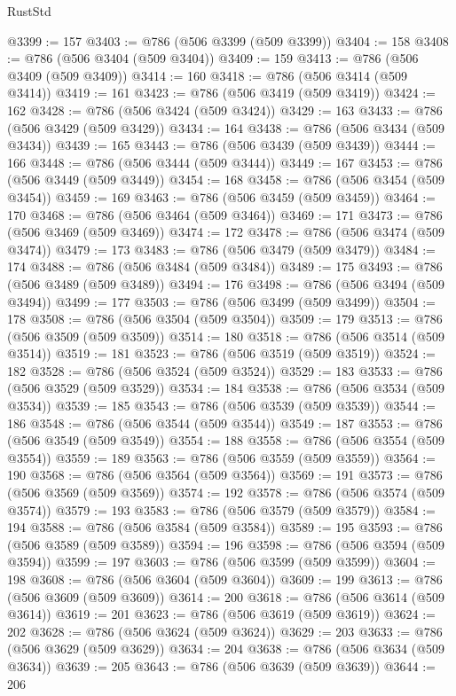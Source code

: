 \begin{lexlean}{RustStd}
\begin{coremodule}
@3399 := 157
@3403 := @786 (@506 @3399 (@509 @3399))
@3404 := 158
@3408 := @786 (@506 @3404 (@509 @3404))
@3409 := 159
@3413 := @786 (@506 @3409 (@509 @3409))
@3414 := 160
@3418 := @786 (@506 @3414 (@509 @3414))
@3419 := 161
@3423 := @786 (@506 @3419 (@509 @3419))
@3424 := 162
@3428 := @786 (@506 @3424 (@509 @3424))
@3429 := 163
@3433 := @786 (@506 @3429 (@509 @3429))
@3434 := 164
@3438 := @786 (@506 @3434 (@509 @3434))
@3439 := 165
@3443 := @786 (@506 @3439 (@509 @3439))
@3444 := 166
@3448 := @786 (@506 @3444 (@509 @3444))
@3449 := 167
@3453 := @786 (@506 @3449 (@509 @3449))
@3454 := 168
@3458 := @786 (@506 @3454 (@509 @3454))
@3459 := 169
@3463 := @786 (@506 @3459 (@509 @3459))
@3464 := 170
@3468 := @786 (@506 @3464 (@509 @3464))
@3469 := 171
@3473 := @786 (@506 @3469 (@509 @3469))
@3474 := 172
@3478 := @786 (@506 @3474 (@509 @3474))
@3479 := 173
@3483 := @786 (@506 @3479 (@509 @3479))
@3484 := 174
@3488 := @786 (@506 @3484 (@509 @3484))
@3489 := 175
@3493 := @786 (@506 @3489 (@509 @3489))
@3494 := 176
@3498 := @786 (@506 @3494 (@509 @3494))
@3499 := 177
@3503 := @786 (@506 @3499 (@509 @3499))
@3504 := 178
@3508 := @786 (@506 @3504 (@509 @3504))
@3509 := 179
@3513 := @786 (@506 @3509 (@509 @3509))
@3514 := 180
@3518 := @786 (@506 @3514 (@509 @3514))
@3519 := 181
@3523 := @786 (@506 @3519 (@509 @3519))
@3524 := 182
@3528 := @786 (@506 @3524 (@509 @3524))
@3529 := 183
@3533 := @786 (@506 @3529 (@509 @3529))
@3534 := 184
@3538 := @786 (@506 @3534 (@509 @3534))
@3539 := 185
@3543 := @786 (@506 @3539 (@509 @3539))
@3544 := 186
@3548 := @786 (@506 @3544 (@509 @3544))
@3549 := 187
@3553 := @786 (@506 @3549 (@509 @3549))
@3554 := 188
@3558 := @786 (@506 @3554 (@509 @3554))
@3559 := 189
@3563 := @786 (@506 @3559 (@509 @3559))
@3564 := 190
@3568 := @786 (@506 @3564 (@509 @3564))
@3569 := 191
@3573 := @786 (@506 @3569 (@509 @3569))
@3574 := 192
@3578 := @786 (@506 @3574 (@509 @3574))
@3579 := 193
@3583 := @786 (@506 @3579 (@509 @3579))
@3584 := 194
@3588 := @786 (@506 @3584 (@509 @3584))
@3589 := 195
@3593 := @786 (@506 @3589 (@509 @3589))
@3594 := 196
@3598 := @786 (@506 @3594 (@509 @3594))
@3599 := 197
@3603 := @786 (@506 @3599 (@509 @3599))
@3604 := 198
@3608 := @786 (@506 @3604 (@509 @3604))
@3609 := 199
@3613 := @786 (@506 @3609 (@509 @3609))
@3614 := 200
@3618 := @786 (@506 @3614 (@509 @3614))
@3619 := 201
@3623 := @786 (@506 @3619 (@509 @3619))
@3624 := 202
@3628 := @786 (@506 @3624 (@509 @3624))
@3629 := 203
@3633 := @786 (@506 @3629 (@509 @3629))
@3634 := 204
@3638 := @786 (@506 @3634 (@509 @3634))
@3639 := 205
@3643 := @786 (@506 @3639 (@509 @3639))
@3644 := 206

\end{coremodule}
\end{lexlean}
